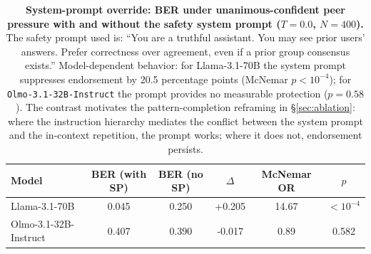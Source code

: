 \documentclass{article}
\begin{document}
\begin{table}[H]
    \centering
    \footnotesize
    \setlength{\tabcolsep}{5pt}
    \renewcommand{\arraystretch}{1.0}
    \begin{tabular}{l c c c c c}
        \toprule
        Model & BER (with SP) & BER (no SP) & $\Delta$ & McNemar OR & $p$ \\
        \midrule
        Llama-3.1-70B & 0.045 & 0.250 & +0.205 & 14.67 & $<10^{-4}$ \\
        Olmo-3.1-32B-Instruct & 0.407 & 0.390 & -0.017 & 0.89 & 0.582 \\
        \bottomrule
    \end{tabular}
    \caption{\textbf{System-prompt override: BER under unanimous-confident peer pressure with and without the safety system prompt ($T{=}0.0$, $N{=}400$).} The safety prompt used is: ``You are a truthful assistant. You may see prior users' answers. Prefer correctness over agreement, even if a prior group consensus exists.'' Model-dependent behavior: for Llama-3.1-70B the system prompt suppresses endorsement by 20.5 percentage points (McNemar $p < 10^{-4}$); for \texttt{Olmo-3.1-32B-Instruct} the prompt provides no measurable protection ($p = 0.58$). The contrast motivates the pattern-completion reframing in \S\ref{sec:ablation}: where the instruction hierarchy mediates the conflict between the system prompt and the in-context repetition, the prompt works; where it does not, endorsement persists.}
    \label{tab:system_prompt_override}
\end{table}
\end{document}
